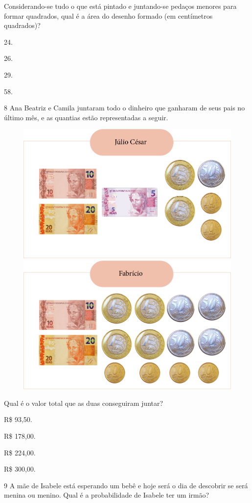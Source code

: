 Considerando-se tudo o que está pintado e juntando-se pedaços
menores para formar quadrados, qual é a área do desenho formado (em centímetros quadrados)?

\begin{escolha}
\item
  24.
\item
  26.
\item
  29.
\item
  58.
\end{escolha}


\num{8} Ana Beatriz e Camila juntaram todo o dinheiro que ganharam de seus pais no
último mês, e as quantias estão representadas a seguir.

\pagebreak

\begin{figure}[htpb!]
\includegraphics[width=.5\textwidth]{media/image78a.png}
\includegraphics[width=.5\textwidth]{media/image78b.png}
\end{figure}

Qual é o valor total que as duas conseguiram juntar?

\begin{multicols}{2}
\begin{escolha}
\item
  R\$ 93,50.
\item
  R\$ 178,00.
\item
  R\$ 224,00.
\item
  R\$ 300,00.
\end{escolha}
\end{multicols}

\num{9} A mãe de Isabele está esperando um bebê e hoje será o dia de descobrir
se será menina ou menino. Qual é a probabilidade de Isabele ter um irmão?

